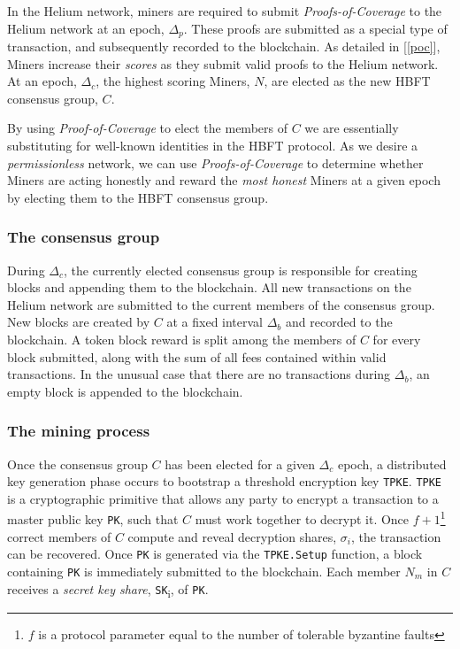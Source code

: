 \documentclass[10pt, nonatbib, nocopyrightspace, reprint]{sigplanconf}
\newcommand{\secref}[1]{[\autoref{#1}]}
\begin{document}
In the Helium network, miners are required to submit \emph{Proofs-of-Coverage} to the Helium network at an epoch, $\Delta_p$. These proofs are submitted as a special type of transaction, and subsequently recorded to the blockchain. As detailed in \secref{poc}, Miners increase their \emph{scores} as they submit valid proofs to the Helium network. At an epoch, $\Delta_c$, the highest scoring Miners, $N$, are elected as the new HBFT consensus group, $C$.

By using \emph{Proof-of-Coverage} to elect the members of $C$ we are essentially substituting for well-known identities in the HBFT protocol. As we desire a \emph{permissionless} network, we can use \emph{Proofs-of-Coverage} to determine whether Miners are acting honestly and reward the \emph{most honest} Miners at a given epoch by electing them to the HBFT consensus group.

\subsubsection{The consensus group}

During $\Delta_c$, the currently elected consensus group is responsible for creating blocks and appending them to the blockchain. All new transactions on the Helium network are submitted to the current members of the consensus group. New blocks are created by $C$ at a fixed interval $\Delta_b$ and recorded to the blockchain. A token block reward is split among the members of $C$ for every block submitted, along with the sum of all fees contained within valid transactions. In the unusual case that there are no transactions during $\Delta_b$, an empty block is appended to the blockchain.

\subsubsection{The mining process}

Once the consensus group $C$ has been elected for a given $\Delta_c$ epoch, a distributed key generation phase occurs to bootstrap a threshold encryption key \verb|TPKE|. \verb|TPKE| is a cryptographic primitive that allows any party to encrypt a transaction to a master public key \verb|PK|, such that $C$ must work together to decrypt it. Once $f + 1$\footnote{$f$ is a protocol parameter equal to the number of tolerable byzantine faults} correct members of $C$ compute and reveal decryption shares, $\sigma_i$, the transaction can be recovered. Once \verb|PK| is generated via the \verb|TPKE.Setup| function, a block containing \verb|PK| is immediately submitted to the blockchain. Each member $N_m$ in $C$ receives a \emph{secret key share}, \verb|SK|\textsubscript{i}, of \verb|PK|.
\end{document}
